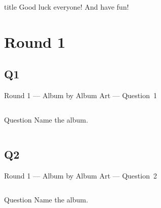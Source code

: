 \documentclass[11pt]{beamer}
\begin{document}
\begingroup{}
\begin{frame}
\vfill{}
\begin{beamercolorbox}[sep=8pt,center,shadow=true,rounded=true]{title}
Good luck everyone! And have fun!
\end{beamercolorbox}
\vfill{}
\end{frame}
\endgroup{}
\def\thisSectionName{Album by Album Art}
\section{Round 1}
\subsection*{Q1}
\begin{frame}[t]{Round 1 --- Album by Album Art --- \mbox{Question 1}}
\begin{columns}[T,totalwidth=\linewidth]
\begin{column}{0.32\linewidth}
\begin{block}{Question}
Name the album.
\end{block}
\end{column}
\begin{column}{0.65\linewidth}
\begin{center}
\texttt{[image: \{Images/harddaysnight]}.jpeg}
\end{center}
\end{column}
\end{columns}
\end{frame}
\subsection*{Q2}
\begin{frame}[t]{Round 1 --- Album by Album Art --- \mbox{Question 2}}
\begin{columns}[T,totalwidth=\linewidth]
\begin{column}{0.32\linewidth}
\begin{block}{Question}
Name the album.
\end{block}
\end{column}
\begin{column}{0.65\linewidth}
\begin{center}
\texttt{[image: \{Images/thewall]}.jpg}
\end{center}
\end{column}
\end{columns}
\end{frame}
\end{document}
